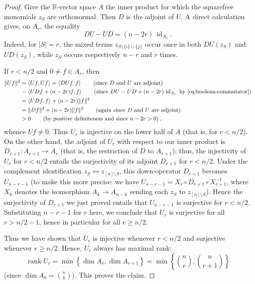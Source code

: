 \documentclass[12pt]{amsart}
\theoremstyle{definition}
\theoremstyle{remark}
\newcommand{\rank}{\operatorname{rank}}
\begin{document}
\begin{proof}
Give the $\mathbb{R}$-vector space $A$ the inner product for which the squarefree
monomials $z_S$ are orthonormal.
Then $D$ is the adjoint of $U$.
A direct calculation gives, on $A_r$, the equality
\begin{equation}\label{eq:boolean-commutator}
 DU-UD=(n-2r)\,\operatorname{id}_{A_r}.
\end{equation}
Indeed, for $|S|=r$, the mixed terms
$z_{S\setminus\{i\}\cup\{j\}}$ occur once in both $DU(z_S)$ and $UD(z_S)$,
while $z_S$ occurs respectively $n-r$ and $r$ times.

If $r<n/2$ and $0\ne f\in A_r$, then
\begin{align*}
\|Uf\|^2
&= \langle Uf, Uf\rangle
= \langle DUf,f\rangle \qquad \left(\text{since $D$ and $U$ are adjoint}\right) \\
&= \langle UDf + (n-2r)f,f\rangle
 \qquad \left(\text{since } DU=UD+(n-2r)\,\operatorname{id}_{A_r} \text{ by } \eqref{eq:boolean-commutator}\right) \\
&= \langle UDf,f\rangle+(n-2r)\|f\|^2 \\
&=\|Df\|^2+(n-2r)\|f\|^2
 \qquad\left(\text{again since $D$ and $U$ are adjoint}\right)
\\
&>0 \qquad \left(\text{by positive definiteness and since $n-2r>0$}\right),
\end{align*}
whence $Uf \neq 0$.
Thus $U_r$ is injective on the lower half of $A$ (that is, for $r < n/2$).
On the other hand, the adjoint of $U_r$ with respect to our inner
product is $D_{r+1}:A_{r+1}\to A_r$ (that is, the restriction of $D$
to $A_{r+1}$); thus, the injectivity of $U_r$ for $r < n/2$
entails the surjectivity of its adjoint $D_{r+1}$ for $r < n/2$.
Under the complement identification
$z_S\leftrightarrow z_{[n]\setminus S}$, this down-operator $D_{r+1}$ becomes
$U_{n-r-1}$ (to make this more precise: we have
$U_{n-r-1} = X_{r} \circ D_{r+1} \circ X_{r+1}^{-1}$, where $X_k$
denotes the isomorphism $A_k \to A_{n-k}$ sending each
$z_S$ to $z_{[n] \setminus S}$).
Hence the surjectivity of $D_{r+1}$ we just proved entails that
$U_{n-r-1}$ is surjective for $r < n/2$.
Substituting $n-r-1$ for $r$ here, we conclude that $U_r$ is
surjective for all $r > n/2-1$, hence in particular for all $r \geq n/2$.

Thus we have shown that $U_r$ is injective whenever $r < n/2$ and
surjective whenever $r \geq n/2$. Hence, $U_r$ always has maximal
rank:
\[
\rank U_r = \min\left\{ \dim A_r, \dim A_{r+1} \right\}
= \min\left\{ \binom nr, \binom n{r+1} \right\}
\]
(since $\dim A_k=\binom nk$). This proves the claim.


\end{proof}
\end{document}
